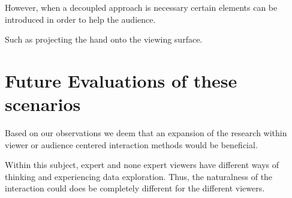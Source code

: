 \documentclass[review,journal]{vgtc}         %
\begin{document}
However, when a decoupled approach is necessary certain elements can be introduced in order to help the audience.

Such as projecting the hand onto the viewing surface.

\section{Future Evaluations of these scenarios}\label{sec:future}

Based on our observations we deem that an expansion of the research within viewer or audience centered interaction methods would be beneficial.

Within this subject, expert and none expert viewers have different ways of thinking and experiencing data exploration. Thus, the naturalness of the interaction could does be completely different for the different viewers.



\end{document}
